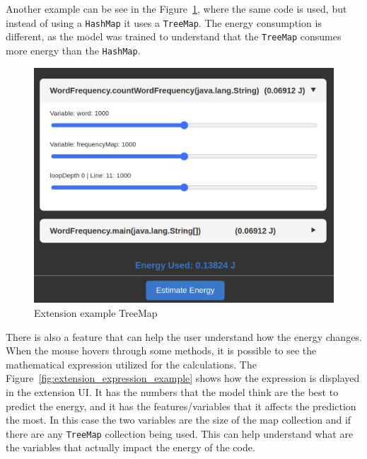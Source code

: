 Another example can be see in the Figure~\ref{fig:extension_example2}, where the same code is used, but instead of using a \texttt{HashMap} it uses a \texttt{TreeMap}. The energy consumption is different, as the model was trained to understand that the \texttt{TreeMap} consumes more energy than the \texttt{HashMap}.




\begin{figure}[htbp]
  \centering
  \includegraphics[width = .8 \textwidth]{figures/extension_example2.png}
  \caption{Extension example TreeMap}
  \label{fig:extension_example2}
\end{figure}

There is also a feature that can help the user understand how the energy changes. When the mouse hovers through some methods, it is possible to see the mathematical expression utilized for the calculations. The Figure~\ref{fig:extension_expression_example} shows how the expression is displayed in the extension UI. It has the numbers that the model think are the best to predict the energy, and it has the features/variables that it affects the prediction the most. In this case the two variables are the size of the map collection and if there are any \texttt{TreeMap} collection being used. This can help understand what are the variables that actually impact the energy of the code. 



